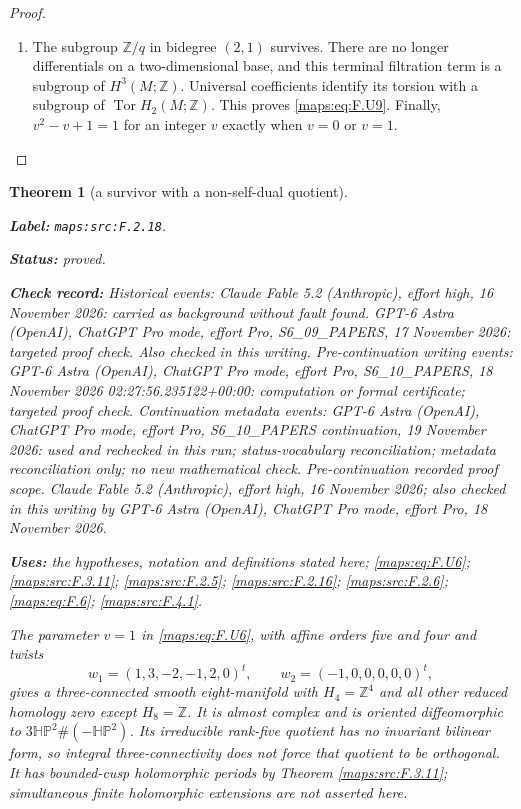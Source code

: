 \documentclass[11pt,a4paper]{article}
\newtheorem{theorem}{Theorem}[section]
\theoremstyle{definition}
\newcommand{\StatementRecord}[4]{\par\smallskip\begingroup\upshape\raggedright\noindent\textbf{Label:} \nolinkurl{#1}.\par\noindent\textbf{Status:} #2.\par\noindent\textbf{Check record:} #3.\par\noindent\textbf{Uses:} #4.\par\endgroup\smallskip}
\begin{document}
\begin{proof}
\begin{enumerate}[label=\arabic*.]
\item The subgroup $\mathbb Z/q$ in bidegree $(2,1)$ survives.
There are no longer differentials on a two-dimensional base,
and this terminal filtration term is a subgroup of
$H^3(M;\mathbb Z)$.  Universal coefficients identify its
torsion with a subgroup of $\operatorname{Tor}H_2(M;\mathbb Z)$.
This proves \eqref{maps:eq:F.U9}.  Finally, $v^2-v+1=1$ for an integer $v$
exactly when $v=0$ or $v=1$.

\end{enumerate}
\end{proof}




\begin{theorem}[a survivor with a non-self-dual quotient]\label{maps:src:F.2.18}
\StatementRecord{maps:src:F.2.18}{proved}{Historical events: Claude Fable 5.2 (Anthropic), effort high, 16 November 2026: carried as background without fault found. GPT-6 Astra (OpenAI), ChatGPT Pro mode, effort Pro, S6\_09\_PAPERS, 17 November 2026: targeted proof check. Also checked in this writing. Pre-continuation writing events: GPT-6 Astra (OpenAI), ChatGPT Pro mode, effort Pro, S6\_10\_PAPERS, 18 November 2026 02:27:56.235122+00:00: computation or formal certificate; targeted proof check. Continuation metadata events: GPT-6 Astra (OpenAI), ChatGPT Pro mode, effort Pro, S6\_10\_PAPERS continuation, 19 November 2026: used and rechecked in this run; status-vocabulary reconciliation; metadata reconciliation only; no new mathematical check. \emph{Pre-continuation recorded proof scope.} Claude Fable 5.2 (Anthropic), effort high, 16 November 2026; also checked in this writing by GPT-6 Astra (OpenAI), ChatGPT Pro mode, effort Pro, 18 November 2026}{the hypotheses, notation and definitions stated here; \cref{maps:eq:F.U6}; \cref{maps:src:F.3.11}; \cref{maps:src:F.2.5}; \cref{maps:src:F.2.16}; \cref{maps:src:F.2.6}; \cref{maps:eq:F.6}; \cref{maps:src:F.4.1}}


The parameter $v=1$ in \eqref{maps:eq:F.U6}, with affine orders five and four
and twists
\[
 w_1=(1,3,-2,-1,2,0)^t,\qquad
 w_2=(-1,0,0,0,0,0)^t,
\]
gives a three-connected smooth eight-manifold with
$H_4=\mathbb Z^4$ and all other reduced homology zero except
$H_8=\mathbb Z$.  It is almost complex and is oriented
diffeomorphic to $3\mathbb{HP}^2\#(-\mathbb{HP}^2)$.
Its irreducible rank-five quotient has no invariant bilinear
form, so integral three-connectivity does not force that
quotient to be orthogonal.  It has bounded-cusp holomorphic
periods by Theorem \ref{maps:src:F.3.11}; simultaneous finite holomorphic
extensions are not asserted here.

\end{theorem}
\end{document}
